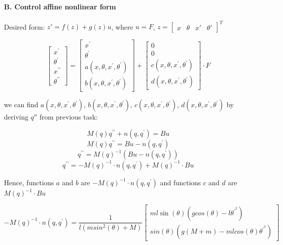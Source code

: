\documentclass{article}
\begin{document}
   \paragraph{B. Control affine nonlinear form}
    
   \leavevmode
    
   \noindent
   Desired form: $z' = f(z) + g(z)u$, where $u = F $, $z = \begin{bmatrix} x & \theta & x' & \theta' \end{bmatrix}^T$
   
   $$
        \begin{bmatrix}
            x^\prime \\ \theta^\prime \\ x^{\prime\prime} \\ \theta^{\prime\prime}
        \end{bmatrix} = 
        \begin{bmatrix}
            x^\prime \\ \theta^\prime \\
            a(x, \theta, x^\prime, \theta^\prime) \\
            b(x, \theta, x^\prime, \theta^\prime)
        \end{bmatrix} +
        \begin{bmatrix}
            0 \\ 0 \\
            c(x, \theta, x^\prime, \theta^\prime) \\
            d(x, \theta, x^\prime, \theta^\prime)
        \end{bmatrix} \cdot F
    $$
    
    \noindent
    we can find $ a(x, \theta, x^\prime, \theta^\prime)$, $ b(x, \theta, x^\prime, \theta^\prime)$, $ c(x, \theta, x^\prime, \theta^\prime)$, $d(x, \theta, x^\prime, \theta^\prime)$ by deriving $q''$ from previous task:
    
    $$M(q)q^{\prime\prime}+n(q, q^\prime)=Bu$$
    $$M(q)q^{\prime\prime} = Bu - n(q, q^\prime)$$
    $$q^{\prime\prime} = M(q)^{-1}(Bu - n(q, q^\prime))$$
    $$q^{\prime\prime} = -M(q)^{-1} \cdot n(q, q^\prime) + M(q)^{-1} \cdot Bu$$
    
    Hence, functions $a$ and $b$ are $-M(q)^{-1} \cdot n(q, q^\prime)$ and functions $c$ and $d$ are $M(q)^{-1} \cdot Bu$
    
    
    $$
        -M(q)^{-1} \cdot n(q, q^\prime) = \frac{1}{l(msin^2(\theta)+ M)}
        \begin{bmatrix}
            ml \sin(\theta) (gcos(\theta)-l\theta^{\prime^2}) \\
            sin(\theta) (g(M+m)-mlcos(\theta)\theta^{\prime^2})
        \end{bmatrix}
    $$
        
\end{document}
